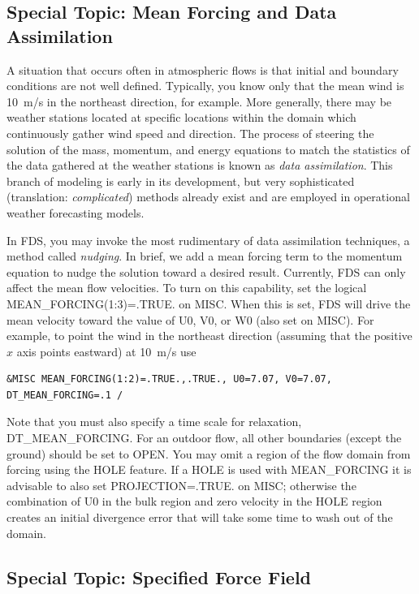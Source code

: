 \documentclass[11pt]{book}
\begin{document}
\subsection{Special Topic: Mean Forcing and Data Assimilation}
\label{info:mean_forcing}

A situation that occurs often in atmospheric flows is that initial and boundary conditions are not well defined.  Typically, you know only that the mean wind is 10~m/s in the northeast direction, for example.  More generally, there may be weather stations located at specific locations within the domain which continuously gather wind speed and direction.  The process of steering the solution of the mass, momentum, and energy equations to match the statistics of the data gathered at the weather stations is known as \emph{data assimilation}.  This branch of modeling is early in its development, but very sophisticated (translation: \emph{complicated}) methods already exist \cite{Kalnay:2003} and are employed in operational weather forecasting models.

In FDS, you may invoke the most rudimentary of data assimilation techniques, a method called \emph{nudging}.  In brief, we add a mean forcing term to the momentum equation to nudge the solution toward a desired result.  Currently, FDS can only affect the mean flow velocities.  To turn on this capability, set the logical {\ct MEAN\_FORCING(1:3)=.TRUE.} on {\ct MISC}.  When this is set, FDS will drive the mean velocity toward the value of {\ct U0}, {\ct V0}, or {\ct W0} (also set on {\ct MISC}).  For example, to point the wind in the northeast direction (assuming that the positive $x$ axis points eastward) at 10~m/s use
\begin{lstlisting}
&MISC MEAN_FORCING(1:2)=.TRUE.,.TRUE., U0=7.07, V0=7.07, DT_MEAN_FORCING=.1 /
\end{lstlisting}
Note that you must also specify a time scale for relaxation, {\ct DT\_MEAN\_FORCING}. For an outdoor flow, all other boundaries (except the ground) should be set to {\ct OPEN}. You may omit a region of the flow domain from forcing using the {\ct HOLE} feature.  If a {\ct HOLE} is used with {\ct MEAN\_FORCING} it is advisable to also set {\ct PROJECTION=.TRUE.} on {\ct MISC}; otherwise the combination of {\ct U0} in the bulk region and zero velocity in the {\ct HOLE} region creates an initial divergence error that will take some time to wash out of the domain.

\subsection{Special Topic: Specified Force Field}
\label{info:force_vector}
\end{document}
